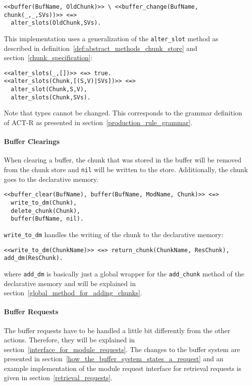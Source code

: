 \begin{lstlisting}
<<buffer(BufName, OldChunk)>> \ <<buffer_change(BufName, chunk(_,_,SVs))>> <=>
  alter_slots(OldChunk,SVs).
\end{lstlisting}

This implementation uses a generalization of the \verb|alter_slot| method as described in definition~\ref{def:abstract_methods_chunk_store} and section~\ref{chunk_specification}:

\begin{lstlisting}  
<<alter_slots(_,[])>> <=> true.
<<alter_slots(Chunk,[(S,V)|SVs])>> <=> 
  alter_slot(Chunk,S,V),
  alter_slots(Chunk,SVs). 
\end{lstlisting}

Note that types cannot be changed. This corresponds to the grammar definition of ACT-R as presented in section~\ref{production_rule_grammar}.

\paragraph{Buffer Clearings}

When clearing a buffer, the chunk that was stored in the buffer will be removed from the chunk store and \verb|nil| will be written to the store. Additionally, the chunk goes to the declarative memory.

\begin{lstlisting}
<<buffer_clear(BufName), buffer(BufName, ModName, Chunk)>> <=> 
  write_to_dm(Chunk), 
  delete_chunk(Chunk), 
  buffer(BufName, nil).
\end{lstlisting}

\verb|write_to_dm| handles the writing of the chunk to the declarative memory:

\begin{lstlisting}
<<write_to_dm(ChunkName)>> <=> return_chunk(ChunkName, ResChunk), add_dm(ResChunk).
\end{lstlisting}

where \verb|add_dm| is basically just a global wrapper for the \verb|add_chunk| method of the declarative memory and will be explained in section~\ref{global_method_for_adding_chunks}.

\paragraph{Buffer Requests} The buffer requests have to be handled a little bit differently from the other actions. Therefore, they will be explained in section~\ref{interface_for_module_requests}. The changes to the buffer system are presented in section~\ref{how_the_buffer_system_states_a_request} and an example implementation of the module request interface for retrieval requests is given in section~\ref{retrieval_requests}.


